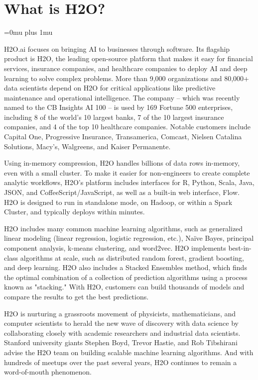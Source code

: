 \documentclass{standalone}
\begin{document}
\section{What is H2O?}
\Urlmuskip=0mu plus 1mu\relax %


H2O.ai focuses on bringing AI to businesses through software.
Its flagship product is H2O, the leading open-source platform that makes it easy for financial
services, insurance companies, and healthcare companies to deploy AI and deep learning to solve complex problems.
More than 9,000 organizations and 80,000+ data scientists depend on H2O for critical applications like predictive
maintenance and operational intelligence. The company -- which was recently named to the CB Insights AI 100 -- is used
by 169 Fortune 500 enterprises, including 8 of the world's 10 largest banks, 7 of the 10 largest insurance companies, and
4 of the top 10 healthcare companies. Notable customers include Capital One, Progressive Insurance, Transamerica, Comcast,
Nielsen Catalina Solutions, Macy's, Walgreens, and Kaiser Permanente.

Using in-memory compression, H2O handles billions of data rows in-memory, even with a small cluster. To make it easier
for non-engineers to create complete analytic workflows, H2O's platform includes interfaces for R, Python, Scala, Java,
JSON, and CoffeeScript/JavaScript, as well as a built-in web interface, Flow. H2O is designed to run in standalone
mode, on Hadoop, or within a Spark Cluster, and typically deploys within minutes.

H2O includes many common machine learning algorithms, such as generalized linear modeling (linear regression, logistic
regression, etc.), Na\"{i}ve Bayes, principal component analysis, k-means clustering, and word2vec. H2O implements
best-in-class algorithms at scale, such as distributed random forest, gradient boosting, and deep learning. H2O also
includes a Stacked Ensembles method, which finds the optimal combination of a collection of prediction algorithms using
a process known as "stacking." With H2O, customers can build thousands of models and compare the results to get the
best predictions.

H2O is nurturing a grassroots movement of physicists, mathematicians, and computer scientists to herald the new wave
of discovery with data science by collaborating closely with academic researchers and industrial data scientists.
Stanford university giants Stephen Boyd, Trevor Hastie, and Rob Tibshirani advise the H2O team on building scalable
machine learning algorithms. And with hundreds of meetups over the past several years, H2O continues to remain
a word-of-mouth phenomenon.
\end{document}
